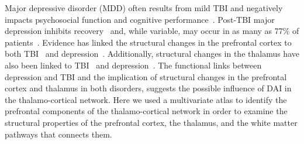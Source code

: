 Major depressive disorder (MDD) often results from mild TBI and negatively impacts psychosocial function and cognitive performance~\cite{Fann1997,Feinstein2006,Jorge2004}. Post-TBI major depression inhibits recovery~\cite{Gordon2006b,Jorge2005} and, while variable, may occur in as many as 77\% of patients~\cite{Alfano2006,Ashman2004,Deb1999,Jorge2005,Reekum2000}. Evidence has linked the structural changes in the prefrontal cortex to both TBI~\cite{Jorge2004} and depression~\cite{Koenigs2008}. Additionally, structural changes in the thalamus have also been linked to TBI~\cite{Graham2005} and depression~\cite{Young2004}. The functional links between depression and TBI and the implication of structural changes in the prefrontal cortex and thalamus in both disorders, suggests the possible influence of DAI in the thalamo-cortical network. Here we used a multivariate atlas to identify the prefrontal components of the thalamo-cortical network in order to examine the structural properties of the prefrontal cortex, the thalamus, and the white matter pathways that connects them.



